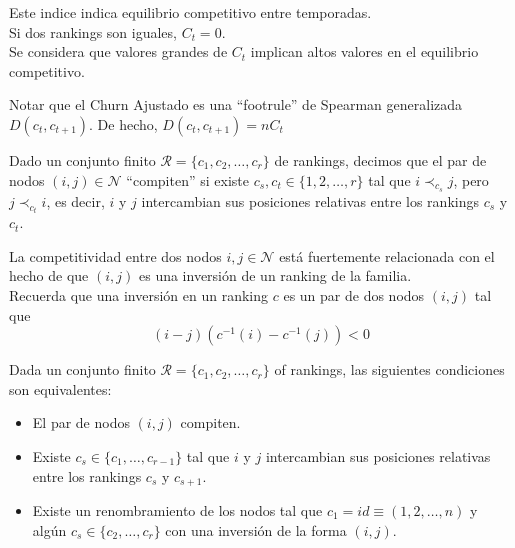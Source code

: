 \begin{nota}
Este indice indica equilibrio competitivo entre temporadas.\\

Si dos rankings son iguales, $C_t = 0$.\\

Se considera que valores grandes de $C_t$ implican altos valores en el equilibrio competitivo.
\end{nota}

\begin{nota}
Notar que el Churn Ajustado es una ``footrule'' de Spearman generalizada $D(c_t, c_{t+1})$. De hecho, $D(c_t, c_{t+1}) = nC_t$
\end{nota}

\begin{defi}
Dado un conjunto finito $\mathcal{R} = \{c_1,c_2,\dots, c_r\}$ de rankings, decimos que el par de nodos $(i,j) \in \mathcal{N}$ ``compiten'' si existe $c_s, c_t \in \{1,2,\dots, r\}$ tal que $i \prec_{c_s} j$, pero $j \prec_{c_t} i$, es decir, $i$ y $j$ intercambian sus posiciones relativas entre los rankings $c_s$ y $c_t$. 
\end{defi}

\begin{nota}
La competitividad entre dos nodos $i, j \in \mathcal{N}$ está fuertemente relacionada con el hecho de que $(i,j)$ es una inversión de un ranking de la familia.\\

Recuerda que una inversión en un ranking $c$ es un par de dos nodos $(i,j)$ tal que
\[(i-j)(c^{-1}(i) - c^{-1}(j)) < 0\]
\end{nota}

\begin{lema}\label{lema:rankings}
Dada un conjunto finito $\mathcal{R} = \{c_1, c_2, \dots, c_r\}$ of rankings, las siguientes condiciones son equivalentes:

\begin{itemize}
\item El par de nodos $(i,j)$ compiten.
\item Existe $c_s \in \{c_1,\dots,c_{r-1}\}$ tal que $i$ y $j$ intercambian sus posiciones relativas entre los rankings $c_s$ y $c_{s+1}$.
\item Existe un renombramiento de los nodos tal que $c_1 = id \equiv (1,2,\dots, n)$ y algún $c_s \in \{c_2,\dots,c_r\}$ con una inversión de la forma $(i,j)$.
\end{itemize} 
\end{lema}

